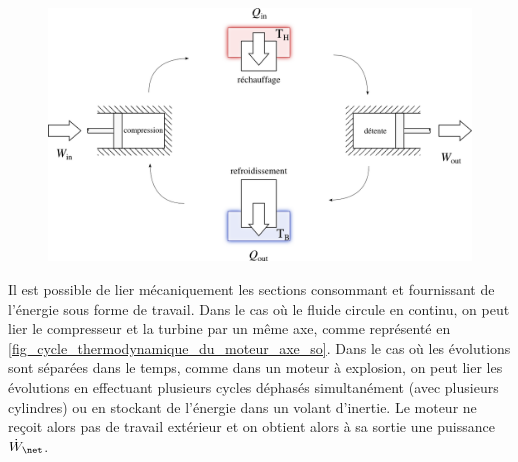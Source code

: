 		\begin{figure}
			\begin{center}
				\includegraphics[width=\textwidth]{images/moteur_sf.png}
			\end{center}
			\label{fig_cycle_thermodynamique_du_moteur_sf}
		\end{figure}

		Il est possible de lier mécaniquement les sections consommant et fournissant de l’énergie sous forme de travail. Dans le cas où le fluide circule en continu, on peut lier le compresseur et la turbine par un même axe, comme représenté en \cref{fig_cycle_thermodynamique_du_moteur_axe_so}. Dans le cas où les évolutions sont séparées dans le temps, comme dans un moteur à explosion, on peut lier les évolutions en effectuant plusieurs cycles déphasés simultanément (avec plusieurs cylindres) ou en stockant de l’énergie dans un volant d’inertie. Le moteur ne reçoit alors pas de travail extérieur et on obtient alors à sa sortie une puissance $\dot W_\net$.

